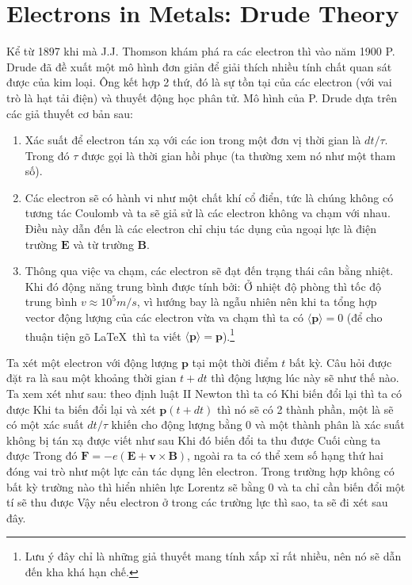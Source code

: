 \section{Electrons in Metals: Drude Theory}
Kể từ 1897 khi mà J.J. Thomson khám phá ra các electron thì vào năm 1900 P. Drude đã đề xuất một mô hình đơn giản để giải thích nhiều tính chất quan sát được của kim loại.
Ông kết hợp 2 thứ, đó là sự tồn tại của các electron (với vai trò là hạt tải điện) và thuyết động học phân tử. Mô hình của P. Drude dựa trên các giả thuyết cơ bản sau:
    \begin{enumerate}
        \item Xác suất để electron tán xạ với các ion trong một đơn vị thời gian là $dt/\tau$. Trong đó $\tau$ được gọi là thời gian hồi phục (ta thường xem nó như một tham số).
        \item Các electron sẽ có hành vi như một chất khí cổ điển, tức là chúng không có tương tác Coulomb và ta sẽ giả sử là các electron không va chạm với nhau. Điều này dẫn đến là các electron
        chỉ chịu tác dụng của ngoại lực là điện trường $\mathbf{E}$ và từ trường $\mathbf{B}$.
        \item Thông qua việc va chạm, các electron sẽ đạt đến trạng thái cân bằng nhiệt. Khi đó động năng trung bình được tính bởi:
        Ở nhiệt độ phòng thì tốc độ trung bình $v\approx 10^5 m/s$, vì hướng bay là ngẫu nhiên nên khi ta tổng hợp vector động lượng của các electron vừa va chạm thì ta có $\langle \mathbf{p} \rangle= 0 $ (để cho thuận tiện gõ \LaTeX \ thì ta viết $\langle \mathbf{p} \rangle = \mathbf{p} $).\footnote{Lưu ý đây chỉ là những giả thuyết mang tính xấp xỉ rất nhiều, nên nó sẽ dẫn đến kha khá hạn chế.}
    \end{enumerate}
Ta xét một electron với động lượng $\mathbf{p}$ tại một thời điểm $t$ bất kỳ. Câu hỏi được đặt ra là sau một khoảng thời gian $t + dt$ thì động lượng lúc này sẽ như thế nào. Ta xem xét như sau: theo định luật II Newton thì ta có
Khi biến đổi lại thì ta có được
Khi ta biến đổi lại và xét $\mathbf{p}(t+dt)$ thì nó sẽ có 2 thành phần, một là sẽ có một xác suất $dt/\tau$ khiến cho động lượng bằng 0 và một thành phân là xác suất không bị tán xạ được viết như sau
Khi đó biến đổi ta thu được
Cuối cùng ta được
Trong đó $\mathbf{F} = -e(\mathbf{E} + \mathbf{v}\times\mathbf{B})$, ngoài ra ta có thể xem số hạng thứ hai đóng vai trò như một lực cản tác dụng lên electron. Trong trường hợp không có bất kỳ trường nào
thì hiển nhiên lực Lorentz sẽ bằng 0 và ta chỉ cần biến đổi một tí sẽ thu được
Vậy nếu electron ở trong các trường lực thì sao, ta sẽ đi xét sau đây.
